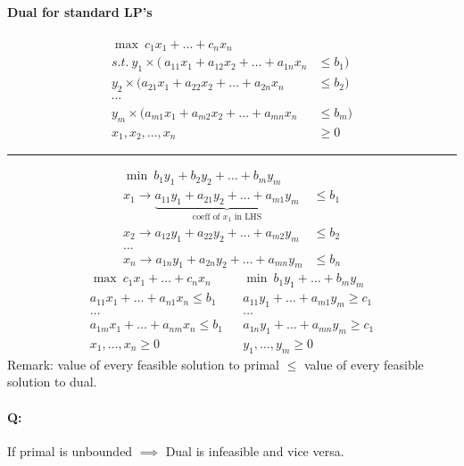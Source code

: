 \documentclass[12 pt]{article}
\begin{document}
          \paragraph{Dual for standard LP's}
          \begin{align*}
            \max \ c_1 x_1 + \ldots + c_n x_n &
            \\ s.t. \ y_1 \times (\ a_{11}x_1 + a_{12}x_2+\ldots + a_{1n}x_{n} & \leq b_1)
            \\ y_2 \times( a_{21}x_1 + a_{22}x_2+\ldots + a_{2n}x_{n} & \leq b_2)
            \\ \cdots
            \\ y_m \times (a_{m1}x_1 + a_{m2}x_2+\ldots + a_{mn}x_{n} & \leq b_m)
            \\ x_1, x_2, \ldots, x_n & \geq 0
          \end{align*}
          \noindent \rule{\textwidth}{0.5pt}
          \begin{align*}
            \min \ b_1y_1 + b_2y_2 + \ldots + b_my_m &
            \\ x_1 \to \underbrace{a_{11}y_1 + a_{21}y_2 + \ldots +
            a_{m1}y_m}_{\text{coeff of $x_1$ in LHS}} & \leq b_1
            \\ x_2 \to a_{12}y_1 + a_{22}y_2 + \ldots + a_{m2}y_m & \leq b_2
            \\ \ldots
            \\ x_n \to a_{1n}y_1 + a_{2n}y_2 + \ldots + a_{mn}y_m & \leq b_n
          \end{align*}
          \begin{align*}
            \max \ c_1x_1 + \ldots + c_n x_n \ &  & \min \ b_1y_1 + \ldots + b_m y_m
                                                    \\ a_{11}x_1 + \ldots + a_{n1}x_n \leq b_1 & & a_{11}y_1 + \ldots + a_{m1}y_m \geq c_1
            \\ \ldots & & \ldots
            \\ a_{1m}x_1 + \ldots + a_{nm}x_n \leq b_1 & & a_{1n}y_1 + \ldots + a_{mn}y_m \geq c_1
            \\ x_1, \ldots, x_n \geq 0 & & y_1, \ldots, y_m \geq 0
          \end{align*}
          Remark: value of every feasible solution to primal $\leq$
          value of every feasible solution to dual.
          \paragraph{Q:} If primal is unbounded $\implies$ Dual is
          infeasible and vice versa.
\end{document}
